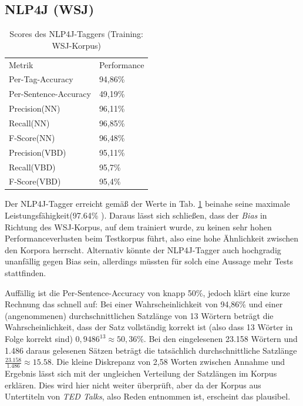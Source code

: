 \subsection{NLP4J (WSJ)}
\label{sec:eval:detail:nlp4j}

\begin{table}[htb]
\centering
\captionsetup{justification=centering,margin=2cm}
\begin{tabular}{l|l}
Metrik & Performance \\
\cline{1-2}
Per-Tag-Accuracy & 94,86\%\\
Per-Sentence-Accuracy & 49,19\%\\
\cline{1-2}
Precision(NN) & 96,11\%\\
Recall(NN) & 96,85\%\\
F-Score(NN) & 96,48\%\\
\cline{1-2}
Precision(VBD) & 95,11\%\\
Recall(VBD) & 95,7\%\\
F-Score(VBD) & 95,4\%
\end{tabular}
\vspace{3mm}
\caption{Scores des NLP4J-Taggers (Training: WSJ-Korpus)}
\label{tab:eval:detail:nlp4j}
\end{table}

Der NLP4J-Tagger erreicht gemäß der Werte in Tab. \ref{tab:eval:detail:nlp4j} beinahe seine maximale Leistungsfähigkeit(97.64\% \cite{choi}). Daraus lässt sich schließen, dass der \textit{Bias} in Richtung des WSJ-Korpus, auf dem trainiert wurde, zu keinen sehr hohen Performanceverlusten beim Testkorpus führt, also eine hohe Ähnlichkeit zwischen den Korpora herrscht. Alternativ könnte der NLP4J-Tagger auch hochgradig unanfällig gegen Bias sein, allerdings müssten für solch eine Aussage mehr Tests stattfinden. 

Auffällig ist die Per-Sentence-Accuracy von knapp 50\%, jedoch klärt eine kurze Rechnung das schnell auf: Bei einer Wahrscheinlichkeit von 94,86\% und einer (angenommenen) durchschnittlichen Satzlänge von 13 Wörtern beträgt die Wahrscheinlichkeit, dass der Satz vollständig korrekt ist (also dass 13 Wörter in Folge korrekt sind) $0,9486^{13}\approx 50,36\% $. Bei den eingelesenen 23.158 Wörtern und 1.486 daraus gelesenen Sätzen beträgt die tatsächlich durchschnittliche Satzlänge $\frac{23.158}{1.486}\approx 15.58 $. Die kleine Diskrepanz von 2,58 Worten zwischen Annahme und Ergebnis lässt sich mit der ungleichen Verteilung der Satzlängen im Korpus erklären. Dies wird hier nicht weiter überprüft, aber da der Korpus aus Untertiteln von \textit{TED Talks}, also Reden entnommen ist, erscheint das plausibel.


